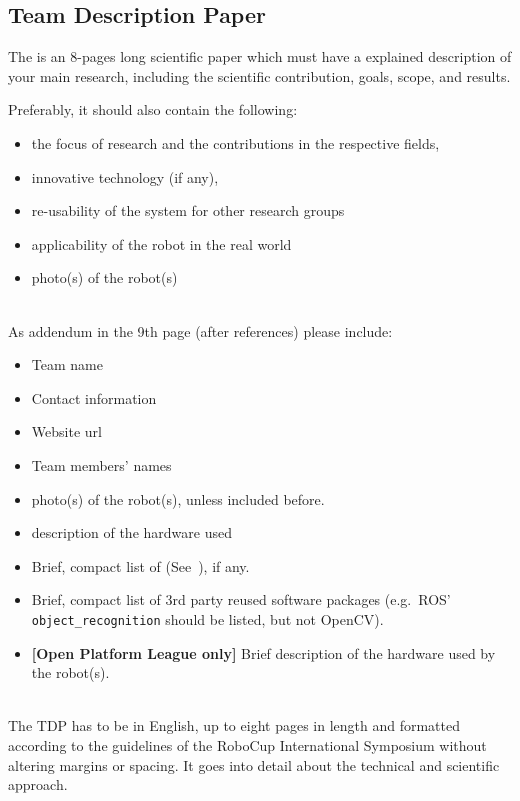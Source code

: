 \subsection{Team Description Paper}
\label{rule:website_tdp}
The  is an 8-pages long scientific paper which must have a explained description of your main research, including the scientific contribution, goals, scope, and results.

Preferably, it should also contain the following:
\begin{itemize}
	\item the focus of research and the contributions in the respective fields,
	\item innovative technology (if any),
	\item re-usability of the system for other research groups
	\item applicability of the robot in the real world
	\item photo(s) of the robot(s)
\end{itemize}

~\\\noindent As addendum in the 9th page (after references) please include:
\begin{itemize}
	\item Team name
	\item Contact information
	\item Website url
	\item Team members' names
	\item photo(s) of the robot(s), unless included before.
	\item description of the hardware used
	\item Brief, compact list of  (See~), if any.
	\item Brief, compact list of 3rd party reused software packages (e.g.~ROS' \texttt{object\_recognition} should be listed, but not OpenCV).
	\item \textbf{[Open Platform League only]} Brief description of the hardware used by the robot(s).
\end{itemize}

~\\\noindent The TDP has to be in English, up to eight pages in length and formatted according to the guidelines of the RoboCup International Symposium without altering margins or spacing. It goes into detail about the technical and scientific approach.

